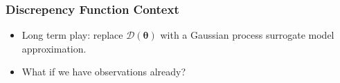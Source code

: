 \documentclass{beamer}
\begin{document}

\begin{frame}
    \frametitle{Discrepency Function Context}
    \begin{itemize}
        \item Long term play: replace $\mathcal{D}(\bm{\theta})$ with a
              Gaussian process surrogate model approximation.
        \item <2-> What if we have observations already?
    \end{itemize}

\end{frame}
\end{document}
